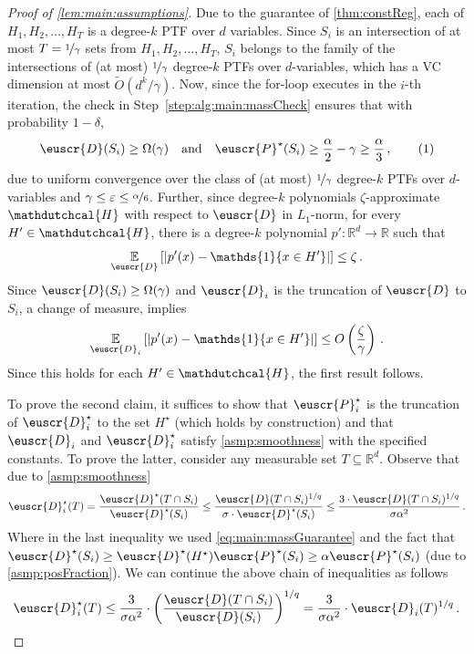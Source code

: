 \documentclass[11pt]{article}
\theoremstyle{plain}
\theoremstyle{definition}
\theoremstyle{remark}
\newcommand{\yesnum}{\addtocounter{equation}{1}\tag{\theequation}}
\newcommand{\quadtext}[1]{\quad\text{#1}\quad}
\newcommand{\quadand}{\quadtext{and}}
\def\abs#1{\left| #1 \right|}
\newcommand{\sinbrace}[1]{\{#1\}}
\newcommand{\inparen}[1]{\left(#1\right)}
\newcommand{\insquare}[1]{\left[#1\right]}
\newcommand{\R}{\mathbb{R}}
\newcommand{\E}{\operatornamewithlimits{\mathbb{E}}}
\newcommand{\Ex}{\E}
\newcommand{\nfrac}[2]{\nicefrac{#1}{#2}}
\newcommand{\eps}{\varepsilon}
\newcommand{\wt}[1]{\widetilde{#1}}
\newcommand{\customcal}[1]{\euscr{#1}}
\newcommand{\cD}{\customcal{D}}
\newcommand{\cP}{\customcal{P}}
\newcommand{\hypo}[1]{\mathdutchcal{#1}}
\newcommand{\hyH}{\hypo{H}}
\newcommand{\optset}{{H^\star}}
\newcommand{\cDtrue}{\cD^\star}
\newcommand{\cDgiven}{\cD}
\newcommand{\cPtrue}{\cP^\star}
\newcommand{\nL}{L}
\begin{document}
            \begin{proof}[Proof of \cref{lem:main:assumptions}]
                Due to the guarantee of \cref{thm:constReg}, each of $H_1,H_2,\dots,H_T$ is a degree-$k$ PTF over $d$ variables.
                Since $S_i$ is an intersection of at most $T=\nfrac{1}{\gamma}$ sets from $H_1,H_2,\dots,H_T$, $S_i$ belongs to the family of the intersections of (at most) $\nfrac{1}{\gamma}$ degree-$k$ PTFs over $d$-variables, which has a VC dimension at most $\wt{O}(d^k/\gamma)$.
                Now, since the for-loop executes in the $i$-th iteration, the check in Step~\ref{step:alg:main:massCheck} ensures that with probability $1-\delta$, 
                \[
                    \cD(S_i)\geq \Omega({\gamma})
                    \quadand
                    \cPtrue(S_i)\geq \frac{\alpha}{2}-\gamma \geq \frac{\alpha}{3}\,,
                    \yesnum\label{eq:main:massGuarantee}
                \]
                due to uniform convergence over the class of (at most) $\nfrac{1}{\gamma}$ degree-$k$ PTFs over $d$-variables and $\gamma\leq \eps \leq \nfrac{\alpha}{6}$.
                Further, since degree-$k$ polynomials $\zeta$-approximate $\hyH$ with respect to  $\cDgiven$ in $\nL_1$-norm, for every $H'\in \hyH$, there is a degree-$k$ polynomial $p'\colon \R^d\to \R$ such that 
                \[
                    \Ex_{\cDgiven}\insquare{\abs{p'(x) - \mathds{1}\sinbrace{x\in H'}}}\leq \zeta\,.
                \]
                Since $\cD(S_i)\geq \Omega(\gamma)$ and $\cDgiven_i$ is the truncation of $\cD$ to $S_i$, a change of measure, implies 
                \[
                    \Ex_{\cDgiven_i}\insquare{\abs{p'(x) - \mathds{1}\sinbrace{x\in H'}}}\leq O\inparen{\frac{\zeta}{\gamma}}\,.
                \]
                Since this holds for each $H'\in \hyH$, the first result follows.

                To prove the second claim, it suffices to show that $\cPtrue_i$ is the truncation of $\cDtrue_i$ to the set $\optset$ (which holds by construction) and that $\cDgiven_i$ and $\cDtrue_i$ satisfy \cref{asmp:smoothness} with the specified constants.
                To prove the latter, consider any measurable set $T\subseteq \R^d$.
                Observe that due to \cref{asmp:smoothness}
                \[
                    \cDtrue_i(T)
                    = \frac{\cDtrue(T\cap S_i)}{\cDtrue(S_i)}
                    \leq \frac{\cD(T\cap S_i)^{1/q}}{\sigma\cdot \cDtrue(S_i)}
                    \leq \frac{3\cdot \cD(T\cap S_i)^{1/q}}{\sigma \alpha^2}
                    \,.
                \]
                Where in the last inequality we used \cref{eq:main:massGuarantee} and the fact that $\cDtrue(S_i)\geq \cDtrue(\optset)\cPtrue(S_i)\geq \alpha\cPtrue(S_i)$ (due to \cref{asmp:posFraction}).
                We can continue the above chain of inequalities as follows 
                \[
                    \cDtrue_i(T)
                    \leq \frac{3}{\sigma\alpha^2} \cdot 
                        \inparen{\frac{\cD(T\cap S_i)}{\cD(S_i)}}^{1/q}
                    = \frac{3}{\sigma\alpha^2}\cdot \cDgiven_i(T)^{1/q}\,.
                \]
            \end{proof}
        
\end{document}
